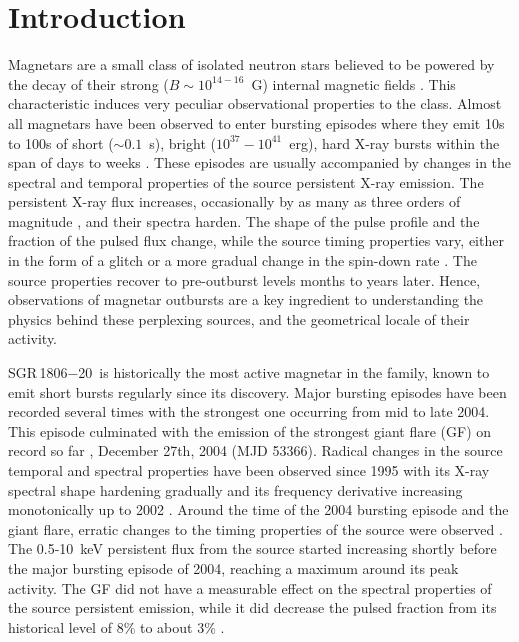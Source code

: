 \documentclass[twocolumn]{aastex6}
\def \src {SGR\,1806$-$20}
\begin{document}
\section{Introduction}
\label{Intro}

Magnetars are a small class of isolated neutron stars believed to be
powered by the decay of their strong ($B\sim10^{14-16}$~G) internal
magnetic fields \citep[see][for reviews]{mereghetti08AARv:magentars,
  turolla15:mag,kaspi17:magnetars}. This characteristic induces very
peculiar observational properties to the class. Almost all magnetars
have been observed to enter bursting episodes where they emit 10s to
100s of short ($\sim0.1$~s), bright ($10^{37}-10^{41}$~erg), hard
X-ray bursts within the span of days to weeks \citep[e.g.,
][]{israel08ApJ:1900,lin11ApJ:1E1841,vanderhorst12ApJ:1550,gogus17ApJ}.
These episodes are usually accompanied by changes in the spectral and temporal
properties of the source persistent X-ray emission. The persistent X-ray
flux increases, occasionally by as many as three orders of magnitude
\citep[e.g.,][]{kargaltsev12apj:1834,scholz12ApJ:1822,rea11:outburst},
and their spectra harden. The shape of the pulse profile and the
fraction of the pulsed flux change, while the source timing properties
vary, either in the form of a glitch or a more gradual change in the
spin-down rate \citep[e.g.,][]{dib14ApJ,archibald15ApJ:1048}. The
source properties recover to pre-outburst levels months to years
later. Hence, observations of magnetar outbursts are a key ingredient
to understanding the physics behind these perplexing sources, and the
geometrical locale of their activity.

\src\ is historically the most active magnetar in the family, known to emit short
bursts regularly since its discovery. Major bursting episodes have been recorded several
times with the strongest one occurring from mid to late 2004. This episode
culminated with the emission of the strongest giant flare (GF) on
record so far \citep{hurley05NaturGF1806,gaensler05Natur:1806},
December 27th, 2004 (MJD 53366).
Radical changes in the source temporal and spectral properties have 
been observed since 1995 with its X-ray spectral shape hardening
gradually and its frequency derivative increasing monotonically up to
2002 \citep{mereghetti05ApJ:1806,woods07ApJ:1806}. Around the time of
the 2004 bursting episode and the giant flare, erratic changes to the
timing properties of the source were observed \citep{woods07ApJ:1806}.
The 0.5-10~keV persistent flux from the source started increasing shortly before
the major bursting episode of 2004, reaching a maximum around its peak
activity. The GF did not have a measurable effect on the spectral
properties of the source persistent emission, while it did decrease 
the pulsed fraction from its historical level of $8\%$ to about $3\%$
\citep{rea05ApJ:1806,tiengo05:1806}.
\end{document}
